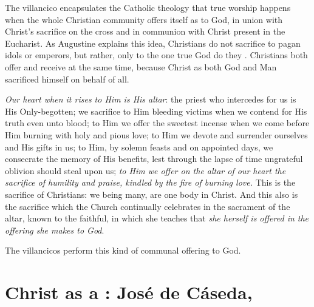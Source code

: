 The villancico encapsulates the Catholic theology that true worship happens
when the whole Christian community offers itself as 
 to God, in union with Christ's sacrifice on the cross and
in communion with Christ present in the Eucharist.
As Augustine explains this idea, Christians do not sacrifice to pagan idols or
emperors, but rather, only to the one true God do they .%
    \Autocite[10:3]{Augustine:CityofGod}
Christians both offer and receive at the same time, because Christ as both God
and Man sacrificed himself on behalf of all.
\begin{quoting}
    \emph{Our heart when it rises to Him is His altar}: the priest who
    intercedes for us is His Only-begotten; we sacrifice to Him bleeding
    victims when we contend for His truth even unto blood; to Him we offer the
    sweetest incense when we come before Him burning with holy and pious love;
    to Him we devote and surrender ourselves and His gifts in us; to Him, by
    solemn feasts and on appointed days, we consecrate the memory of His
    benefits, lest through the lapse of time ungrateful oblivion should steal
    upon us; \emph{to Him we offer on the altar of our heart the sacrifice of
    humility and praise, kindled by the fire of burning love.}
    This is the sacrifice of Christians: we being many, are one body in Christ.
    And this also is the sacrifice which the Church continually celebrates in
    the sacrament of the altar, known to the faithful, in which she teaches
    that \emph{she herself is offered in the offering she makes to God}.%
        \Autocite[10:6, emphasis added]{Augustine:CityofGod}
\end{quoting}
The  villancicos perform this kind of communal offering
to God.

\section{Christ as a : José de Cáseda, }

